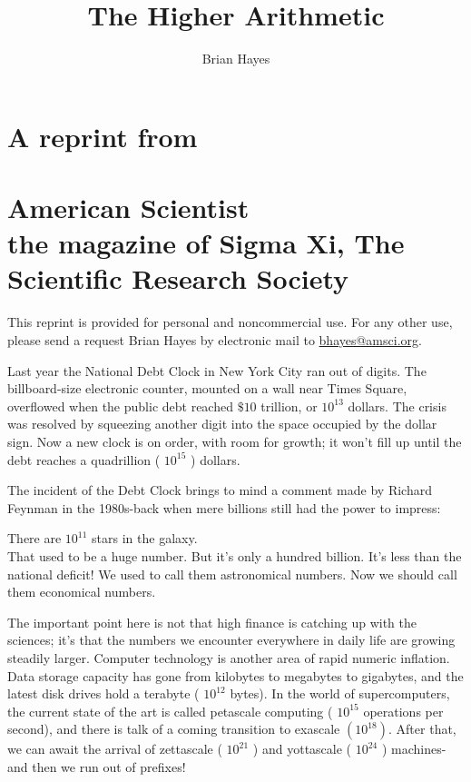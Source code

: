 \documentclass[10pt]{article}
\title{The Higher Arithmetic }
\author{Brian Hayes}
\date{}
\begin{document}
\maketitle
\captionsetup{singlelinecheck=false}
\section*{A reprint from}
\section*{American Scientist \\
 the magazine of Sigma Xi, The Scientific Research Society}
This reprint is provided for personal and noncommercial use. For any other use, please send a request Brian Hayes by electronic mail to \href{mailto:bhayes@amsci.org}{bhayes@amsci.org}.

Last year the National Debt Clock in New York City ran out of digits. The billboard-size electronic counter, mounted on a wall near Times Square, overflowed when the public debt reached $\$ 10$ trillion, or $10^{13}$ dollars. The crisis was resolved by squeezing another digit into the space occupied by the dollar sign. Now a new clock is on order, with room for growth; it won't fill up until the debt reaches a quadrillion ( $10^{15}$ ) dollars.

The incident of the Debt Clock brings to mind a comment made by Richard Feynman in the 1980s-back when mere billions still had the power to impress:

\begin{displayquote}
There are $10^{11}$ stars in the galaxy.\\
That used to be a huge number. But it's only a hundred billion. It's less than the national deficit! We used to call them astronomical numbers. Now we should call them economical numbers.
\end{displayquote}

The important point here is not that high finance is catching up with the sciences; it's that the numbers we encounter everywhere in daily life are growing steadily larger. Computer technology is another area of rapid numeric inflation. Data storage capacity has gone from kilobytes to megabytes to gigabytes, and the latest disk drives hold a terabyte ( $10^{12}$ bytes). In the world of supercomputers, the current state of the art is called petascale computing ( $10^{15}$ operations per second), and there is talk of a coming transition to exascale $\left(10^{18}\right)$. After that, we can await the arrival of zettascale ( $10^{21}$ ) and yottascale ( $10^{24}$ ) machines-and then we run out of prefixes!
\end{document}

